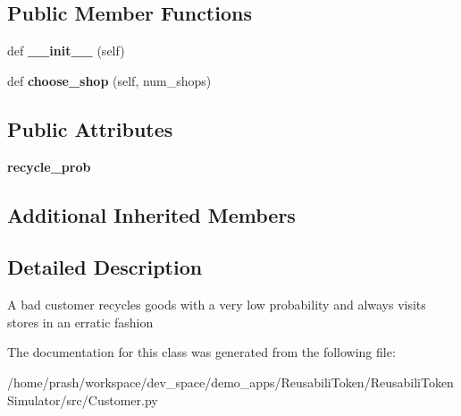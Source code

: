 \subsection*{Public Member Functions}
\begin{DoxyCompactItemize}
\item 
\mbox{\label{class_customer_1_1_bad_customer_a5fb1dbd2f1cb6d0f89b61dcc197c22e4}} 
def {\bfseries \+\_\+\+\_\+init\+\_\+\+\_\+} (self)
\item 
\mbox{\label{class_customer_1_1_bad_customer_a95e7c9c31b4bd91ee0dafdf3c77c4485}} 
def {\bfseries choose\+\_\+shop} (self, num\+\_\+shops)
\end{DoxyCompactItemize}
\subsection*{Public Attributes}
\begin{DoxyCompactItemize}
\item 
\mbox{\label{class_customer_1_1_bad_customer_aed23368f8701a3693f8f9eaf1b734233}} 
{\bfseries recycle\+\_\+prob}
\end{DoxyCompactItemize}
\subsection*{Additional Inherited Members}


\subsection{Detailed Description}
\begin{DoxyVerb}A bad customer recycles goods with a very low probability and always visits stores in an erratic
fashion
\end{DoxyVerb}
 

The documentation for this class was generated from the following file\+:\begin{DoxyCompactItemize}
\item 
/home/prash/workspace/dev\+\_\+space/demo\+\_\+apps/\+Reusabili\+Token/\+Reusabili\+Token\+Simulator/src/Customer.\+py\end{DoxyCompactItemize}
